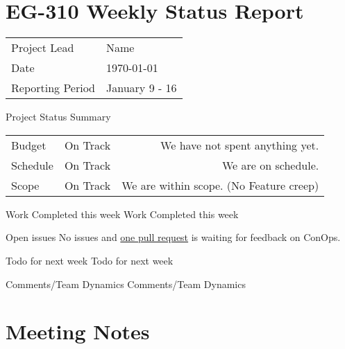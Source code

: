 \documentclass{scrartcl}
\begin{document}
\section*{EG-310 Weekly Status Report}
\begin{center}
    \begin{tabular}{ l l }
        Project Lead     & Name           \\
        Date             & \today         \\
        Reporting Period & January 9 - 16
    \end{tabular}
\end{center}

\begin{defi}{Project Status Summary}{}
    \begin{tabular}{ l l r }
        Budget   & On Track & We have not spent anything yet.         \\
        Schedule & On Track & We are on schedule.                     \\
        Scope    & On Track & We are within scope. (No Feature creep)
    \end{tabular}
\end{defi}

\begin{defi}{Work Completed this week}{}
    Work Completed this week
\end{defi}

\begin{defi}{Open issues}{}
    No issues and \href{https://github.com/KenwoodFox/EG-310-InvertedPendulum/pull/7}{one pull request} is waiting for feedback on ConOps.
\end{defi}

\begin{defi}{Todo for next week}{}
    Todo for next week
\end{defi}

\begin{defi}{Comments/Team Dynamics}{}
    Comments/Team Dynamics
\end{defi}


\pagebreak
\section{Meeting Notes}

\end{document}
